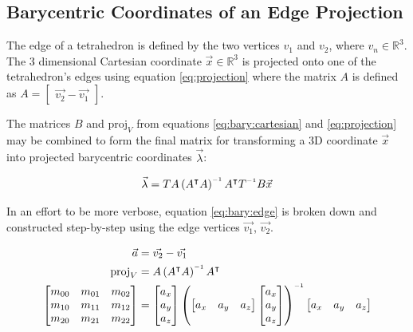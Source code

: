 \subsection{Barycentric Coordinates of an Edge Projection}

The edge of  a tetrahedron is defined by the two vertices $v_1$ and $v_2$, where
$v_n    \in    \mathbb{R}^3$.    The   3   dimensional   Cartesian    coordinate
$\vec{x}\in\mathbb{R}^3$  is projected onto one of the tetrahedron's edges using
equation  \ref{eq:projection}  where  the  matrix  $A$   is   defined  as  $A  =
\begin{bmatrix} \vec{v_2} - \vec{v_1} \end{bmatrix}$.

The matrices $B$ and $\text{proj}_V$ from equations \ref{eq:bary:cartesian}  and
\ref{eq:projection} may be combined to form the final matrix  for transforming a
3D coordinate $\vec{x}$ into projected
barycentric coordinates $\vec{\lambda}$:

\begin{align}
    \label{eq:bary:edge}
    \vec{\lambda} = TA\left(A\transpose A\right)\inverse A\transpose T\inverse B \vec{x}
\end{align}

In an effort to be more verbose, equation \ref{eq:bary:edge} is broken down  and
constructed  step-by-step  using  the  edge  vertices  $\vec{v_1}$, $\vec{v_2}$.

\begin{align*}
    \vec{a} &= \vec{v_2} - \vec{v_1} \\
    \text{proj}_V &= A\left(A\transpose A\right)\inverse A\transpose \\
    \begin{bmatrix}
        m_{00} & m_{01} & m_{02} \\
        m_{10} & m_{11} & m_{12} \\
        m_{20} & m_{21} & m_{22} \\
    \end{bmatrix}
    &=  \begin{bmatrix}
            a_x \\
            a_y \\
            a_z \\
        \end{bmatrix}
        \left(
            \begin{bmatrix}
                a_x & a_y & a_z \\
            \end{bmatrix}
            \begin{bmatrix}
                a_x \\
                a_y \\
                a_z \\
            \end{bmatrix}
        \right)\inverse
        \begin{bmatrix}
            a_x & a_y & a_z \\
        \end{bmatrix}
\end{align*}


